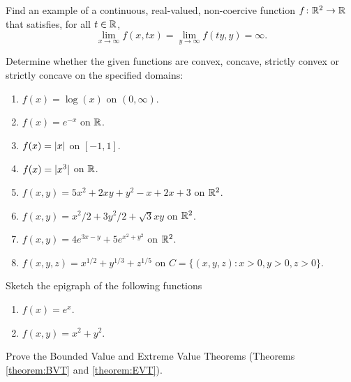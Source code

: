\begin{problem}[Advanced]\cite[p.36, \#32]{peressini1988mathematics}
Find an example of a continuous, real-valued, non-coercive function $f\colon \mathbb{R}^2 \to \mathbb{R}$ that satisfies, for all $t \in \mathbb{R}$,
\begin{equation*}
\lim_{x \to \infty} f(x, tx) = \lim_{y \to \infty} f(ty, y) = \infty.
\end{equation*}
\end{problem}


\begin{problem}[Basic]\cite[p.77, \#1,2,7]{peressini1988mathematics}
Determine whether the given functions are convex, concave, strictly convex or strictly concave on the specified domains:
\begin{enumerate}
	\item $f(x) = \log(x)$ on $(0,\infty)$.
	\item $f(x) = e^{-x}$ on $\mathbb{R}$.
	\item $f(x) = \lvert x \rvert$ on $[-1,1]$.
	\item $f(x) = \lvert x^3 \rvert$ on $\mathbb{R}$.
	\item $f(x,y) = 5x^2+2xy+y^2-x+2x+3$ on $\mathbb{R}^2$.
	\item $f(x,y) = x^2/2+3y^2/2+\sqrt{3}xy$ on $\mathbb{R}^2$.
	\item $f(x,y) = 4e^{3x-y}+5e^{x^2+y^2}$ on $\mathbb{R}^2$.
	\item $f(x,y,z) = x^{1/2} + y^{1/3} + z^{1/5}$ on $C = \{ (x,y,z) : x>0, y>0, z>0 \}$.
\end{enumerate}
\end{problem}

\begin{problem}[Intermediate]\cite[p.79 \#11]{peressini1988mathematics}
Sketch the epigraph of the following functions
\begin{enumerate}
	\item $f(x) = e^x$.
	\item $f(x,y)=x^2+y^2$.
\end{enumerate}
\end{problem}


\begin{problem}[Advanced]
Prove the Bounded Value and Extreme Value Theorems (Theorems \ref{theorem:BVT} and \ref{theorem:EVT}).
\end{problem}

